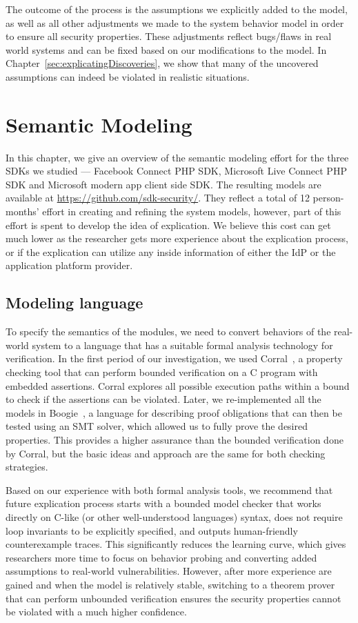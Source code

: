 The outcome of the process is the assumptions we explicitly added to the model, as well as all other adjustments we made to the system behavior model in order to ensure all security properties.  These adjustments reflect bugs/flaws in real world systems and can be fixed based on our modifications to the model.  In Chapter~\ref{sec:explicatingDiscoveries}, we show that many of the uncovered assumptions can indeed be violated in realistic situations. 

\section{Semantic Modeling}
\label{sec:explicatingSemanticModeling}
In this chapter, we give an overview of the semantic modeling effort for the three SDKs we studied --- Facebook Connect PHP SDK, Microsoft Live Connect PHP SDK and Microsoft modern app client side SDK.  The resulting models are available at \url{https://github.com/sdk-security/}. They reflect a total of 12 person-months' effort in creating and refining the system models, however, part of this effort is spent to develop the idea of explication.  We believe this cost can get much lower as the researcher gets more experience about the explication process, or if the explication can utilize any inside information of either the IdP or the application platform provider.

\subsection{Modeling language}

To specify the semantics of the modules, we need to convert behaviors of the real-world system to a language that has a suitable formal analysis technology for verification.  In the first period of our investigation, we used Corral~\cite{Lal:2012:SRM:2362216.2362257}, a property checking tool that can perform bounded verification on a C program with embedded assertions.  Corral explores all possible execution paths within a bound to check if the assertions can be violated.  Later, we re-implemented all the models in Boogie~\cite{Boogie}, a language for describing proof obligations that can then be tested using an SMT solver, which allowed us to fully prove the desired properties.  This provides a higher assurance than the bounded verification done by Corral, but the basic ideas and approach are the same for both checking strategies.

Based on our experience with both formal analysis tools, we recommend that future explication process starts with a bounded model checker that works directly on C-like (or other well-understood languages) syntax, does not require loop invariants to be explicitly specified, and outputs human-friendly counterexample traces.  This significantly reduces the learning curve, which gives researchers more time to focus on behavior probing and converting added assumptions to real-world vulnerabilities.  However, after more experience are gained and when the model is relatively stable, switching to a theorem prover that can perform unbounded verification ensures the security properties cannot be violated with a much higher confidence.

